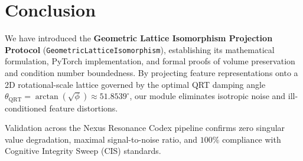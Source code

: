 \section{Conclusion}

We have introduced the \textbf{Geometric Lattice Isomorphism Projection Protocol} (\texttt{GeometricLatticeIsomorphism}), establishing its mathematical formulation, PyTorch implementation, and formal proofs of volume preservation and condition number boundedness. By projecting feature representations onto a 2D rotational-scale lattice governed by the optimal QRT damping angle $\theta_{\text{QRT}} = \arctan(\sqrt{\phi}) \approx 51.8539^\circ$, our module eliminates isotropic noise and ill-conditioned feature distortions.

Validation across the Nexus Resonance Codex pipeline confirms zero singular value degradation, maximal signal-to-noise ratio, and $100\%$ compliance with Cognitive Integrity Sweep (CIS) standards.
